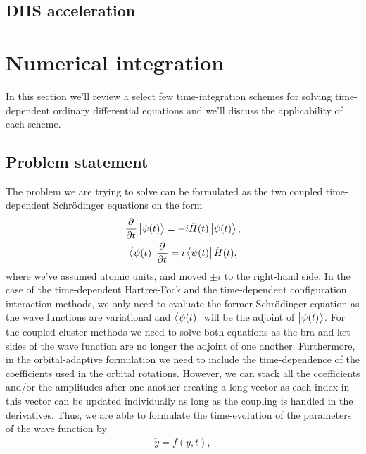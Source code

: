         \subsection{DIIS acceleration}
    \section{Numerical integration}
        \label{sec:numerical-integration}
        In this section we'll review a select few time-integration schemes for
        solving time-dependent ordinary differential equations and we'll discuss the
        applicability of each scheme.

        \subsection{Problem statement}
            The problem we are trying to solve can be formulated as the
            two coupled time-dependent Schrödinger equations on the form
            \begin{gather}
                \dpd{}{t}\ket{\psi(t)}
                = -i\hamil(t)\ket{\psi(t)},
                \\
                \bra{\psi(t)}\dpd{}{t}
                = i\bra{\psi(t)}\hamil(t),
            \end{gather}
            where we've assumed atomic units, and moved $\pm i$ to the right-hand
            side.
            In the case of the time-dependent Hartree-Fock and the
            time-dependent configuration interaction methods, we only need to
            evaluate the former Schrödinger equation as the wave functions are
            variational and $\bra{\psi(t)}$ will be the adjoint of
            $\ket{\psi(t)}$.
            For the coupled cluster methods we need to solve both equations as
            the bra and ket sides of the wave function are no longer the adjoint
            of one another.
            Furthermore, in the orbital-adaptive formulation we need to include
            the time-dependence of the coefficients used in the orbital
            rotations.
            However, we can stack all the coefficients and/or the amplitudes
            after one another creating a long vector as each index in this
            vector can be updated individually as long as the coupling is
            handled in the derivatives.
            Thus, we are able to formulate the time-evolution of the
            parameters of the wave function by
            \begin{align}
                \dot{y} = f(y, t),
            \end{align}
